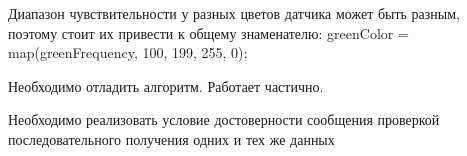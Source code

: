 
\begin{DoxyRefList}
\item[Class \mbox{\hyperlink{class_c_color_tracker}{C\+Color\+Tracker}} ]\label{todo__todo000001}%
%
Диапазон чувствительности у разных цветов датчика может быть разным, поэтому стоит их привести к общему знаменателю\+: green\+Color = map(green\+Frequency, 100, 199, 255, 0);  
\item[Member \mbox{\hyperlink{class_c_drive_control_ad4063995bea6b98e1219ff143bd8afb5}{C\+Drive\+Control::move\+\_\+counting\+\_\+lines}} (int dist\+\_\+in\+\_\+lines)]\label{todo__todo000002}%
%
Необходимо отладить алгоритм. Работает частично.  
\item[Member \mbox{\hyperlink{class_c_hamming_code_a1ee3dd890fd4c28afb5573e10af2e883}{C\+Hamming\+Code::Receive\+Data}} (uint8\+\_\+t $\ast$data)]\label{todo__todo000003}%
%
Необходимо реализовать условие достоверности сообщения проверкой последовательного получения одних и тех же данных 
\end{DoxyRefList}